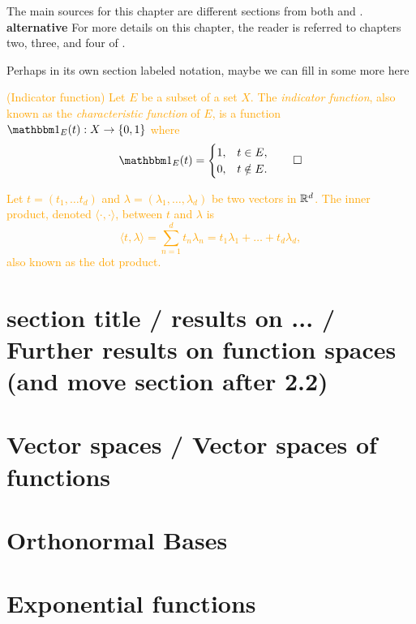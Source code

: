 \documentclass[../thesis.tex]{subfiles}
\begin{document}
The main sources for this chapter are different sections from both \cite{heilMetricsNormsInner2018} and \cite{heilIntroductionRealAnalysis2019}.
\textbf{alternative} For more details on this chapter, the reader is referred to chapters two, three, and four of \cite{heilMetricsNormsInner2018}.

Perhaps in its own section labeled notation, maybe we can fill in some more here
\textcolor{orange}{
\begin{definition}(Indicator function)\label{def:indicator}
    Let $E$ be a subset of a set $X$. The \emph{indicator function}, also known as the \emph{characteristic function} of $E$, is a function $\indicator{E}{t}: X \rightarrow \braq{0,1}$ where
    \begin{equation*}
        \indicator{E}{t}  = 
        \begin{cases} 
            1, &  t\in E,\\
            0, &  t \notin E.
        \end{cases}
        \qedhere
    \end{equation*}
\end{definition}}

\textcolor{orange}{
\begin{definition}\label{def:dot_prod}
    Let $t=(t_1,\dots t_d)$ and $\lambda=(\lambda_1, \dots, \lambda_d)$ be two vectors in $\mathbb{R}^d$. The inner product, denoted $\langle \cdot, \cdot \rangle$, between $t$ and $\lambda$ is
    \begin{equation*}
        \langle t, \lambda \rangle = \sum_{n=1}^d t_n \lambda_n = t_1\lambda_1 + \dots + t_d\lambda_d,
    \end{equation*}
    also known as the dot product. 
\end{definition}
}

\section{section title / results on ... / Further results on function spaces (and move section after 2.2) }
    

\section{Vector spaces / Vector spaces of functions}
    

\section{Orthonormal Bases}
    

\section{Exponential functions}
    
\end{document}

